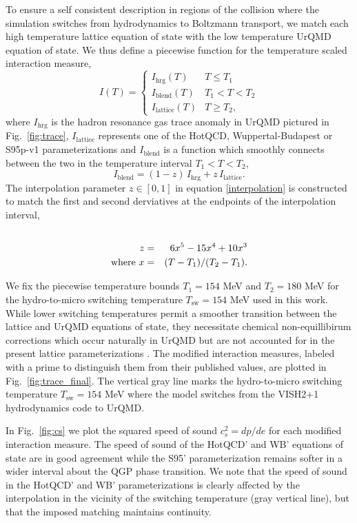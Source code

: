 \documentclass[aps,prc,reprint,amsmath,nofootinbib,superscriptaddress]{revtex4-1}
\begin{document}
To ensure a self consistent description in regions of the collision where the simulation switches from hydrodynamics to Boltzmann transport, we match each high 
temperature lattice equation of state with the low temperature UrQMD equation of state. We thus define a piecewise function for the temperature scaled interaction measure,
\begin{equation}
 \label{interaction}
 I(T) =
  \begin{cases}
   I_\text{hrg}(T)	& T \le T_1 \\
   I_\text{blend}(T)	& T_1 < T < T_2 \\ 
   I_\text{lattice}(T)	& T \ge T_2,
  \end{cases}
\end{equation}
where $I_\text{hrg}$ is the hadron resonance gas trace anomaly in UrQMD pictured in Fig.~\ref{fig:trace}, $I_\text{lattice}$ represents one of the HotQCD, Wuppertal-Budapest or S95p-v1 
parameterizations and $I_\text{blend}$ is a function which smoothly connects between the two in the temperature interval $T_1 < T < T_2$,
\begin{equation}
  \label{interpolation}
  I_\text{blend} = (1-z)\, I_\text{hrg} + z\, I_\text{lattice}.
\end{equation}
The interpolation parameter $z \in [0,1]$ in equation \ref{interpolation} is constructed to match the first and second derviatives at the endpoints of the 
interpolation interval,
\begin{eqnarray}
 \label{smoothstep}
 \cr z &=& 6 x^5 - 15 x^4 + 10 x^3 \\
  \text{where } x &=& (T - T_1)/(T_2 - T_1).
\end{eqnarray}

We fix the piecewise temperature bounds $T_1 = 154$ MeV and $T_2 = 180$ MeV for the hydro-to-micro switching temperature $T_\text{sw} = 154$ MeV used in this work.
While lower switching temperatures permit a smoother transition between the lattice and UrQMD equations of state, they necessitate chemical non-equillibirum corrections 
which occur naturally in UrQMD but are not accounted for in the present lattice parameterizations \cite{?}. The modified interaction measures, labeled with a prime to 
distinguish them from their published values, are plotted in Fig.~\ref{fig:trace_final}. The vertical gray line marks the hydro-to-micro switching temperature 
$T_\text{sw}=154$ MeV where the model switches from the VISH2+1 hydrodynamics code to UrQMD. 

In Fig.~\ref{fig:cs} we plot the squared speed of sound $c_s^2 = dp / de$ for each modified interaction measure. The speed of sound of the HotQCD' and WB' equations
of state are in good agreement while the S95' parameterization remains softer in a wider interval about the QGP phase transition. We note that the speed of sound in 
the HotQCD' and WB' parameterizations is clearly affected by the interpolation in the vicinity of the switching temperature (gray vertical line), but that the 
imposed matching maintains continuity.
\end{document}
